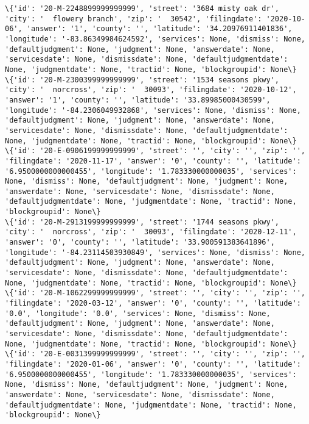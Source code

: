 \documentclass[11pt]{article}
\begin{document}
\begin{Verbatim}[commandchars=\\\{\}]
\{'id': '20-M-2248899999999999', 'street': '3684 misty oak dr', 'city': '  flowery branch', 'zip': '  30542', 'filingdate': '2020-10-06', 'answer': '1', 'county': '', 'latitude': '34.20976911401836', 'longitude': '-83.86349984624592', 'services': None, 'dismiss': None, 'defaultjudgment': None, 'judgment': None, 'answerdate': None, 'servicesdate': None, 'dismissdate': None, 'defaultjudgmentdate': None, 'judgmentdate': None, 'tractid': None, 'blockgroupid': None\}
\{'id': '20-M-2300399999999999', 'street': '1534 seasons pkwy', 'city': '  norcross', 'zip': '  30093', 'filingdate': '2020-10-12', 'answer': '1', 'county': '', 'latitude': '33.89985000430599', 'longitude': '-84.2306049932868', 'services': None, 'dismiss': None, 'defaultjudgment': None, 'judgment': None, 'answerdate': None, 'servicesdate': None, 'dismissdate': None, 'defaultjudgmentdate': None, 'judgmentdate': None, 'tractid': None, 'blockgroupid': None\}
\{'id': '20-E-0906199999999999', 'street': '', 'city': '', 'zip': '', 'filingdate': '2020-11-17', 'answer': '0', 'county': '', 'latitude': '6.9500000000000455', 'longitude': '1.783330000000035', 'services': None, 'dismiss': None, 'defaultjudgment': None, 'judgment': None, 'answerdate': None, 'servicesdate': None, 'dismissdate': None, 'defaultjudgmentdate': None, 'judgmentdate': None, 'tractid': None, 'blockgroupid': None\}
\{'id': '20-M-2913199999999999', 'street': '1744 seasons pkwy', 'city': '  norcross', 'zip': '  30093', 'filingdate': '2020-12-11', 'answer': '0', 'county': '', 'latitude': '33.900591383641896', 'longitude': '-84.23114503930849', 'services': None, 'dismiss': None, 'defaultjudgment': None, 'judgment': None, 'answerdate': None, 'servicesdate': None, 'dismissdate': None, 'defaultjudgmentdate': None, 'judgmentdate': None, 'tractid': None, 'blockgroupid': None\}
\{'id': '20-M-1062299999999999', 'street': '', 'city': '', 'zip': '', 'filingdate': '2020-03-12', 'answer': '0', 'county': '', 'latitude': '0.0', 'longitude': '0.0', 'services': None, 'dismiss': None, 'defaultjudgment': None, 'judgment': None, 'answerdate': None, 'servicesdate': None, 'dismissdate': None, 'defaultjudgmentdate': None, 'judgmentdate': None, 'tractid': None, 'blockgroupid': None\}
\{'id': '20-E-0031399999999999', 'street': '', 'city': '', 'zip': '', 'filingdate': '2020-01-06', 'answer': '0', 'county': '', 'latitude': '6.9500000000000455', 'longitude': '1.783330000000035', 'services': None, 'dismiss': None, 'defaultjudgment': None, 'judgment': None, 'answerdate': None, 'servicesdate': None, 'dismissdate': None, 'defaultjudgmentdate': None, 'judgmentdate': None, 'tractid': None, 'blockgroupid': None\}

\end{Verbatim}
\end{document}
